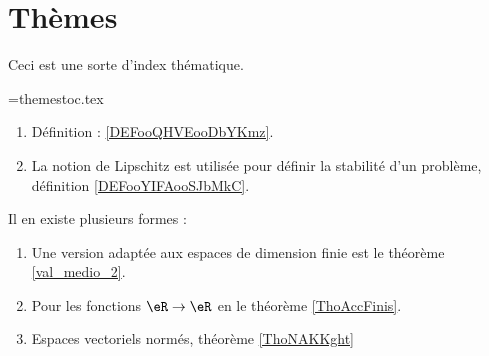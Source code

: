 
\section*{Thèmes}

Ceci est une sorte d'index thématique. 



\begin{multicols}{2}
\noindent

\end{multicols}

\newwrite\themetoc      
\immediate\openout\themetoc=themestoc.tex





    \begin{enumerate}
    \item
        Définition : \ref{DEFooQHVEooDbYKmz}.
    \item
        La notion de Lipschitz est utilisée pour définir la stabilité d'un problème, définition \ref{DEFooYIFAooSJbMkC}.
    \end{enumerate}

    Il en existe plusieurs formes :
    \begin{enumerate}
        \item
            Une version adaptée aux espaces de dimension finie est le théorème \ref{val_medio_2}.
        \item
            Pour les fonctions \( \eR\to \eR\) en le théorème \ref{ThoAccFinis}.
        \item
            Espaces vectoriels normés, théorème \ref{ThoNAKKght}
    \end{enumerate}


